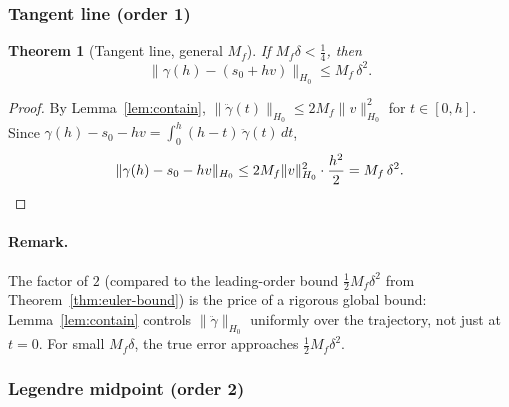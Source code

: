 \documentclass[11pt]{article}
\newtheorem{theorem}{Theorem}
\begin{document}
\subsubsection{Tangent line (order 1)}

\begin{theorem}[Tangent line, general $M_f$]\label{thm:tangent-Mf}
If $M_f\delta < \frac{1}{4}$, then
\[
  \|\gamma(h) - (s_0 + hv)\|_{H_0}
  \leq M_f\,\delta^2.
\]
\end{theorem}
\begin{proof}
By Lemma~\ref{lem:contain},
$\|\ddot\gamma(t)\|_{H_0} \leq 2M_f\|v\|_{H_0}^2$ for
$t \in [0,h]$.  Since $\gamma(h) - s_0 - hv
= \int_0^h (h-t)\,\ddot\gamma(t)\,dt$,
\[
  \|\gamma(h) - s_0 - hv\|_{H_0}
  \leq 2M_f\|v\|_{H_0}^2 \cdot \frac{h^2}{2}
  = M_f\,\delta^2. \qedhere
\]
\end{proof}

\paragraph{Remark.}
The factor of $2$ (compared to the leading-order bound $\frac{1}{2}M_f\delta^2$
from Theorem~\ref{thm:euler-bound}) is the price of a rigorous global bound:
Lemma~\ref{lem:contain} controls $\|\ddot\gamma\|_{H_0}$ uniformly
over the trajectory, not just at $t = 0$.  For small $M_f\delta$,
the true error approaches $\frac{1}{2}M_f\delta^2$.

\subsubsection{Legendre midpoint (order 2)}
\end{document}
